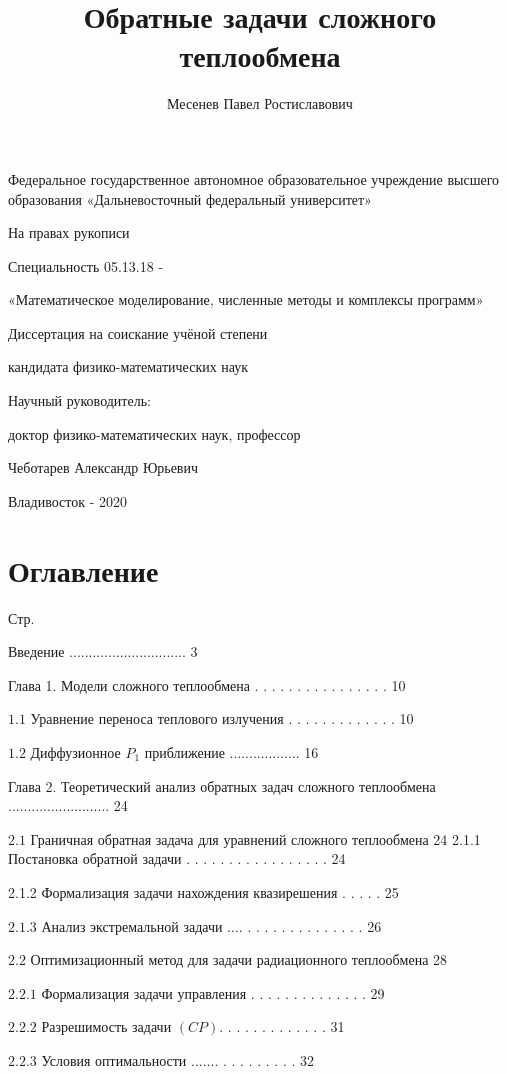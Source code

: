 \documentclass[10pt]{article}
\title{Обратные задачи сложного теплообмена }
\author{Месенев Павел Ростиславович}
\date{}
\begin{document}
\maketitle
Федеральное государственное автономное образовательное учреждение высшего образования «Дальневосточный федеральный университет»

На правах рукописи



Специальность 05.13.18 -

«Математическое моделирование, численные методы и комплексы программ»

Диссертация на соискание учёной степени

кандидата физико-математических наук

Научный руководитель:

доктор физико-математических наук, профессор

Чеботарев Александр Юрьевич

Владивосток - 2020

\section{Оглавление}
Стр.

Введение .............................. 3

Глава 1. Модели сложного теплообмена . . . . . . . . . . . . . . . . 10

$1.1$ Уравнение переноса теплового излучения . . . . . . . . . . . . . 10

$1.2$ Диффузионное $P_{1}$ приближение .................. 16

Глава 2. Теоретический анализ обратных задач сложного теплообмена .......................... 24

$2.1$ Граничная обратная задача для уравнений сложного теплообмена 24 2.1.1 Постановка обратной задачи . . . . . . . . . . . . . . . . . 24

2.1.2 Формализация задачи нахождения квазирешения . . . . . 25

$2.1 .3$ Анализ экстремальной задачи $\ldots$. . . . . . . . . . . . . . . 26

$2.2$ Оптимизационный метод для задачи радиационного теплообмена 28

$2.2 .1$ Формализация задачи управления . . . . . . . . . . . . . . 29

$2.2 .2$ Разрешимость задачи $(C P)$. . . . . . . . . . . . . 31

$2.2 .3$ Условия оптимальности $\ldots \ldots$. . . . . . . . . . 32
\end{document}
